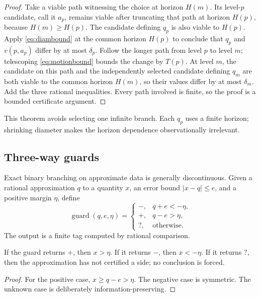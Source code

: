 \begin{proof}
Take a viable path witnessing the choice at horizon \(H(m)\).  Its level-\(p\)
candidate, call it \(a_p\), remains viable after truncating that path at
horizon \(H(p)\), because \(H(m)\ge H(p)\).  The candidate defining \(q_p\) is
also viable to \(H(p)\).  Apply \eqref{eq:diambound} at the common horizon
\(H(p)\) to conclude that \(q_p\) and \(v(p,a_p)\) differ by at most
\(\delta_p\).  Follow the longer path from level \(p\) to level \(m\);
telescoping \eqref{eq:motionbound} bounds the change by \(T(p)\).  At level
\(m\), the candidate on this path and the independently selected candidate
defining \(q_m\) are both viable to the common horizon \(H(m)\), so their
values differ by at most \(\delta_m\).  Add the three rational inequalities.
Every path involved is finite, so the proof is a bounded certificate argument.
\end{proof}

This theorem avoids selecting one infinite branch.  Each \(q_p\) uses a finite
horizon; shrinking diameter makes the horizon dependence observationally
irrelevant.

\subsection{Three-way guards}

Exact binary branching on approximate data is generally discontinuous.  Given
a rational approximation \(q\) to a quantity \(x\), an error bound
\(|x-q|\le e\), and a positive margin \(\eta\), define
\[
 \operatorname{guard}(q,e,\eta)=
 \begin{cases}
  -,&q+e< -\eta,\\
  +,&q-e> \eta,\\
  ?,&\text{otherwise}.
 \end{cases}
\]
The output is a finite tag computed by rational comparison.

\begin{lemma}
If the guard returns \(+\), then \(x>\eta\).  If it returns \(-\), then
\(x<-\eta\).  If it returns \(?\), then the approximation has not certified a
side; no conclusion is forced.
\end{lemma}

\begin{proof}
For the positive case, \(x\ge q-e>\eta\).  The negative case is symmetric.
The unknown case is deliberately information-preserving.
\end{proof}


